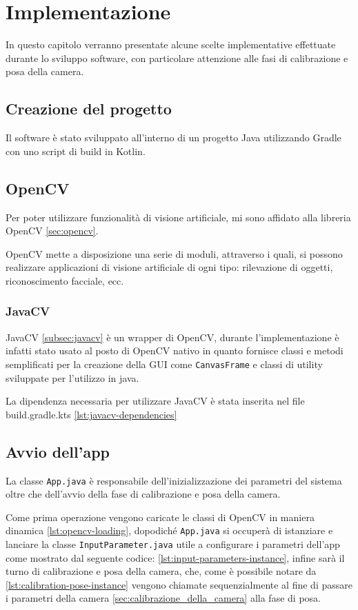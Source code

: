 \documentclass[12pt,a4paper,openright,twoside]{book}
\begin{document}
\chapter{Implementazione}
In questo capitolo verranno presentate alcune scelte implementative effettuate durante lo sviluppo software, con particolare attenzione alle fasi di calibrazione e posa della camera.

\section{Creazione del progetto}
Il software è stato sviluppato all'interno di un progetto Java utilizzando Gradle con uno script di build in Kotlin.

\section{OpenCV}
Per poter utilizzare funzionalità di visione artificiale, mi sono affidato alla libreria OpenCV \ref{sec:opencv}.

OpenCV mette a disposizione una serie di moduli, attraverso i quali, si possono realizzare applicazioni di visione artificiale di ogni tipo: rilevazione di oggetti, riconoscimento facciale, ecc.

\subsection{JavaCV}
JavaCV \ref{subsec:javacv} è un wrapper di OpenCV, durante l'implementazione è infatti stato usato al posto di OpenCV nativo in quanto fornisce classi e metodi semplificati per la creazione della GUI come \texttt{CanvasFrame} e classi di utility sviluppate per l'utilizzo in java.

La dipendenza necessaria per utilizzare JavaCV è stata inserita nel file build.gradle.kts \cref{lst:javacv-dependencies}


\section{Avvio dell'app}
La classe \texttt{App.java} è responsabile dell'inizializzazione dei parametri del sistema oltre che dell'avvio della fase di calibrazione e posa della camera.

Come prima operazione vengono caricate le classi di OpenCV in maniera dinamica \cref{lst:opencv-loading}, dopodiché \texttt{App.java} si occuperà di istanziare e lanciare la classe \texttt{InputParameter.java} utile a configurare i parametri dell'app come mostrato dal seguente codice: \cref{lst:input-parameters-instance}, infine sarà il turno di calibrazione e posa della camera, che, come è possibile notare da \cref{lst:calibration-pose-instance} vengono chiamate sequenzialmente al fine di passare i parametri della camera \ref{sec:calibrazione_della_camera} alla fase di posa.
\end{document}
